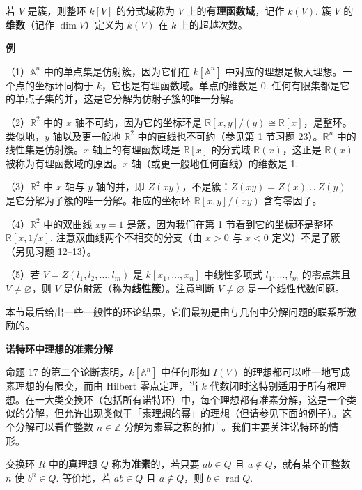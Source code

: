 \begin{definition}
若 \(V\) 是簇，则整环 \(k[V]\) 的分式域称为 \(V\) 上的\textbf{有理函数域}，记作 \(k(V)\). 簇 \(V\) 的\textbf{维数}（记作 \(\dim V\)）定义为 \(k(V)\) 在 \(k\) 上的超越次数。
\end{definition}

\noindent\textbf{例}

（1）\(\mathbb{A}^n\) 中的单点集是仿射簇，因为它们在 \(k[\mathbb{A}^n]\) 中对应的理想是极大理想。一个点的坐标环同构于 \(k\)，它也是有理函数域。单点的维数是 0. 任何有限集都是它的单点子集的并，这是它分解为仿射子簇的唯一分解。

（2）\(\mathbb{R}^2\) 中的 \(x\) 轴不可约，因为它的坐标环是 \(\mathbb{R}[x,y]/(y) \cong \mathbb{R}[x]\)，是整环。类似地，\(y\) 轴以及更一般地 \(\mathbb{R}^2\) 中的直线也不可约（参见第 1 节习题 23）。\(\mathbb{R}^n\) 中的线性集是仿射簇。\(x\) 轴上的有理函数域是 \(\mathbb{R}[x]\) 的分式域 \(\mathbb{R}(x)\)，这正是 \(\mathbb{R}(x)\) 被称为有理函数域的原因。\(x\) 轴（或更一般地任何直线）的维数是 1.

（3）\(\mathbb{R}^2\) 中 \(x\) 轴与 \(y\) 轴的并，即 \(Z(xy)\)，不是簇：\(Z(xy) = Z(x) \cup Z(y)\) 是它分解为子簇的唯一分解。相应的坐标环 \(\mathbb{R}[x,y]/(xy)\) 含有零因子。

（4）\(\mathbb{R}^2\) 中的双曲线 \(xy = 1\) 是簇，因为我们在第 1 节看到它的坐标环是整环 \(\mathbb{R}[x, 1/x]\). 注意双曲线两个不相交的分支（由 \(x > 0\) 与 \(x < 0\) 定义）不是子簇（另见习题 12--13）。

（5）若 \(V = Z(l_1, l_2, \ldots, l_m)\) 是 \(k[x_1, \ldots, x_n]\) 中线性多项式 \(l_1, \ldots, l_m\) 的零点集且 \(V \neq \varnothing\)，则 \(V\) 是仿射簇（称为\textbf{线性簇}）。注意判断 \(V \neq \varnothing\) 是一个线性代数问题。

本节最后给出一些一般性的环论结果，它们最初是由与几何中分解问题的联系所激励的。

\noindent\textbf{诺特环中理想的准素分解}

命题 17 的第二个论断表明，\(k[\mathbb{A}^n]\) 中任何形如 \(I(V)\) 的理想都可以唯一地写成素理想的有限交，而由 Hilbert 零点定理，当 \(k\) 代数闭时这特别适用于所有根理想。在一大类交换环（包括所有诺特环）中，每个理想都有准素分解，这是一个类似的分解，但允许出现类似于「素理想的幂」的理想（但请参见下面的例子）。这个分解可以看作整数 \(n \in \mathbb{Z}\) 分解为素幂之积的推广。我们主要关注诺特环的情形。

\begin{definition}
交换环 \(R\) 中的真理想 \(Q\) 称为\textbf{准素}的，若只要 \(ab \in Q\) 且 \(a \notin Q\)，就有某个正整数 \(n\) 使 \(b^n \in Q\). 等价地，若 \(ab \in Q\) 且 \(a \notin Q\)，则 \(b \in \operatorname{rad}Q\).
\end{definition}


